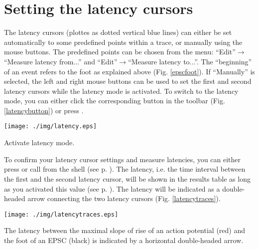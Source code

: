 \section{Setting the latency cursors}
The latency cursors (plottes as dotted vertical blue lines) can either be set automatically to some predefined points within a trace, or manually using the mouse buttons. The predefined points can be chosen from the menu: ``Edit''$\rightarrow$``Measure latency from...'' and ``Edit''$\rightarrow$``Measure latency to...''. The ``beginning'' of an event refers to the foot as explained above (Fig. \ref{epscfoot}). If ``Manually'' is selected, the left and right mouse buttons can be used to set the first and second latency cursors while the latency mode is activated. To switch to the latency mode, you can either click the corresponding button in the toolbar (Fig. \ref{latencybutton}) or press .
  \begin{myfigure}[ht]
    \begin{center}
      \texttt{[image: ./img/latency.eps]}
    \end{center}
    \caption{Activate latency mode.}
    \label{latencybutton}
  \end{myfigure}
  
To confirm your latency cursor settings and measure latencies, you can either press  or call  from the shell (see p. \pageref{measure}). The latency, i.e. the time interval between the first and the second latency cursor, will be shown in the results table as long as you activated this value (see p. \pageref{resultstable}). The latency will be indicated as a double-headed arrow connecting the two latency cursors (Fig. \ref{latencytraces}).
  \begin{myfigure}[ht]
    \begin{center}
      \texttt{[image: ./img/latencytraces.eps]}
    \end{center}
    \caption{The latency between the maximal slope of rise of an action potential (red) and the foot of an EPSC (black) is indicated by a horizontal double-headed arrow.}
    \label{latencytraces}
  \end{myfigure}
